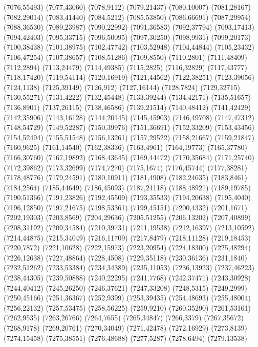 (7076,55493)
(7077,43060)
(7078,9112)
(7079,21437)
(7080,10007)
(7081,28167)
(7082,29014)
(7083,41440)
(7084,5212)
(7085,53850)
(7086,66691)
(7087,29954)
(7088,36530)
(7089,23987)
(7090,22992)
(7091,36583)
(7092,37794)
(7093,17413)
(7094,42403)
(7095,33715)
(7096,50095)
(7097,30250)
(7098,9931)
(7099,20173)
(7100,38438)
(7101,38975)
(7102,47742)
(7103,52948)
(7104,44844)
(7105,23432)
(7106,47254)
(7107,38657)
(7108,51286)
(7109,8550)
(7110,2801)
(7111,48409)
(7112,2894)
(7113,24479)
(7114,49385)
(7115,2825)
(7116,32829)
(7117,43777)
(7118,17420)
(7119,54114)
(7120,16919)
(7121,44562)
(7122,38251)
(7123,39056)
(7124,1138)
(7125,39149)
(7126,912)
(7127,16144)
(7128,7824)
(7129,32715)
(7130,55271)
(7131,4222)
(7132,45448)
(7133,39244)
(7134,42171)
(7135,51657)
(7136,8901)
(7137,26115)
(7138,46586)
(7139,21514)
(7140,48412)
(7141,42429)
(7142,35906)
(7143,16128)
(7144,20145)
(7145,45903)
(7146,49708)
(7147,47312)
(7148,54729)
(7149,52287)
(7150,39976)
(7151,36691)
(7152,33209)
(7153,43456)
(7154,52494)
(7155,51548)
(7156,13261)
(7157,29522)
(7158,21667)
(7159,21847)
(7160,9625)
(7161,14540)
(7162,38336)
(7163,4961)
(7164,19773)
(7165,37780)
(7166,30760)
(7167,19892)
(7168,43645)
(7169,44472)
(7170,35684)
(7171,25740)
(7172,39862)
(7173,32699)
(7174,7270)
(7175,1674)
(7176,45744)
(7177,38281)
(7178,48776)
(7179,24591)
(7180,10911)
(7181,4908)
(7182,24635)
(7183,8461)
(7184,2564)
(7185,44649)
(7186,45093)
(7187,24118)
(7188,48921)
(7189,19785)
(7190,51366)
(7191,23826)
(7192,45509)
(7193,35533)
(7194,20638)
(7195,4040)
(7196,12850)
(7197,21675)
(7198,53361)
(7199,45151)
(7200,4332)
(7201,1671)
(7202,19303)
(7203,8569)
(7204,29636)
(7205,51255)
(7206,13202)
(7207,40899)
(7208,31192)
(7209,34584)
(7210,39731)
(7211,19538)
(7212,16397)
(7213,10592)
(7214,44875)
(7215,34049)
(7216,11709)
(7217,8479)
(7218,11128)
(7219,18453)
(7220,7872)
(7221,10628)
(7222,15973)
(7223,20954)
(7224,18300)
(7225,48294)
(7226,12638)
(7227,48864)
(7228,4508)
(7229,35118)
(7230,36136)
(7231,1840)
(7232,51262)
(7233,53384)
(7234,34389)
(7235,11053)
(7236,13923)
(7237,46223)
(7238,44305)
(7239,50888)
(7240,22295)
(7241,7768)
(7242,37471)
(7243,30928)
(7244,40412)
(7245,26250)
(7246,37621)
(7247,33208)
(7248,5315)
(7249,2999)
(7250,45166)
(7251,36367)
(7252,9399)
(7253,39435)
(7254,48693)
(7255,48004)
(7256,22132)
(7257,53475)
(7258,56225)
(7259,9210)
(7260,35290)
(7261,53161)
(7262,9535)
(7263,26766)
(7264,7655)
(7265,34847)
(7266,3379)
(7267,35672)
(7268,9178)
(7269,20761)
(7270,34049)
(7271,42478)
(7272,16929)
(7273,8139)
(7274,15458)
(7275,38551)
(7276,48688)
(7277,5287)
(7278,6494)
(7279,13538)
